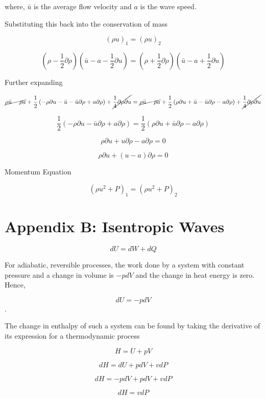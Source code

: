 where, $\bar{u}$ is the average flow velocity and $a$ is the wave speed.


Substituting this back into the conservation of mass

\[\left(\rho u\right)_1 = \left(\rho u\right)_2 \]

\[ 
\left( \rho    - \frac{1}{2}\partial \rho \right) 
\left( \bar{u} - a - \frac{1}{2}\partial u\right) = 
\left( \rho    + \frac{1}{2}\partial \rho \right) 
\left( \bar{u} - a + \frac{1}{2}\partial u\right) 
\]

Further expanding

\[
\cancel{
	\rho \bar{u} - \rho a
} + 
\frac{1}{2} 
\left(
-\rho \partial u - \bar{u} - \bar{u} \partial \rho + a \partial \rho 
\right) +
\cancel{
	\frac{1}{4}\partial \rho \partial u 
}
= 
\cancel{
	\rho \bar{u} - \rho a
} + 
\frac{1}{2} 
\left(
\rho \partial u + \bar{u} - \bar{u} \partial \rho - a \partial \rho 
\right) +
\cancel{
	\frac{1}{4}\partial \rho \partial u 
}
\]
 
\[
  \frac{1}{2}\left( - \rho \partial u - \bar{u} \partial \rho + a \partial \rho\right) = 
  \frac{1}{2}\left(   \rho \partial u + \bar{u} \partial \rho - a \partial \rho\right)
\]

\[
\rho \partial u + u \partial \rho - a \partial \rho = 0 
\]

\[
\rho \partial u + \left( u - a\right)\partial \rho = 0
\]

Momentum Equation

\[
\left(\rho u^2 + P\right)_1 = 
\left(\rho u^2 + P\right)_2\]



\section{Appendix B: Isentropic Waves}

\[dU = dW + dQ\]

For adiabatic, reversible processes, the work done by a system with constant pressure and a change in volume is $-pdV$ and the change in heat energy is zero. Hence,

\[dU = -pdV\].

The change in enthalpy of such a system can be found by taking the derivative of its expression for a thermodynamic process 

\[H = U + pV\]

\[dH = dU + pdV + vdP\]

\[dH = -pdV + pdV + vdP\]

\[dH = vdP\]

